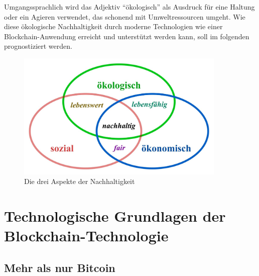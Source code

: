 Umgangssprachlich wird das Adjektiv ``ökologisch'' als Ausdruck für eine Haltung oder ein Agieren verwendet, das schonend mit Umweltressourcen umgeht\cite[13-23]{test123}. Wie diese ökologische Nachhaltigkeit durch moderne Technologien wie einer Blockchain-Anwendung erreicht und unterstützt werden kann, soll im folgenden prognostiziert werden.

\begin{figure}[ht!]
	\centering
	\includegraphics[width=100mm]{nachhaltig.jpg}
	\caption{Die drei Aspekte der Nachhaltigkeit\cite{oekologischeN} \label{overflow}}
\end{figure} 
\chapter{Technologische Grundlagen der Blockchain-Technologie}
\section{Mehr als nur Bitcoin}
